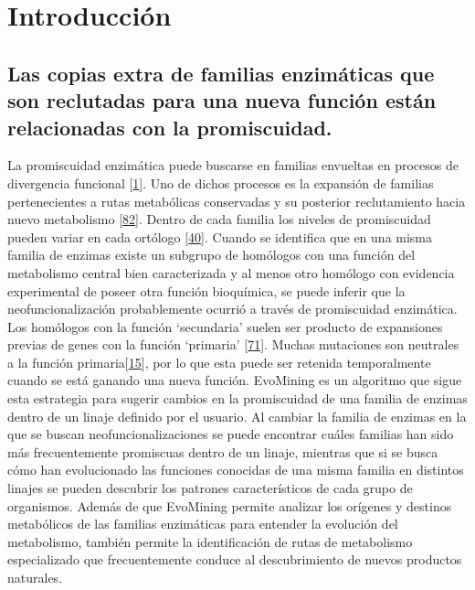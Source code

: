 \documentclass[12pt,twoside]{reedthesis}
\begin{document}
  \section{Introducción}\label{introduccion-1}
  
  \subsection{Las copias extra de familias enzimáticas que son reclutadas
  para una nueva función están relacionadas con la
  promiscuidad.}\label{las-copias-extra-de-familias-enzimaticas-que-son-reclutadas-para-una-nueva-funcion-estan-relacionadas-con-la-promiscuidad.}
  
  La promiscuidad enzimática puede buscarse en familias envueltas en
  procesos de divergencia funcional
  {[}\protect\hyperlink{ref-jensen_enzyme_1976}{1}{]}. Uno de dichos
  procesos es la expansión de familias pertenecientes a rutas metabólicas
  conservadas y su posterior reclutamiento hacia nuevo metabolismo
  {[}\protect\hyperlink{ref-caetano-anolles_origin_metabolism_2009}{82}{]}.
  Dentro de cada familia los niveles de promiscuidad pueden variar en cada
  ortólogo {[}\protect\hyperlink{ref-khanal_differential_2015}{40}{]}.
  Cuando se identifica que en una misma familia de enzimas existe un
  subgrupo de homólogos con una función del metabolismo central bien
  caracterizada y al menos otro homólogo con evidencia experimental de
  poseer otra función bioquímica, se puede inferir que la
  neofuncionalización probablemente ocurrió a través de promiscuidad
  enzimática. Los homólogos con la función `secundaria' suelen ser
  producto de expansiones previas de genes con la función `primaria'
  {[}\protect\hyperlink{ref-huang_enzyme_2012}{71}{]}. Muchas mutaciones
  son neutrales a la función
  primaria{[}\protect\hyperlink{ref-bloom_neutral_2007}{15}{]}, por lo que
  esta puede ser retenida temporalmente cuando se está ganando una nueva
  función. EvoMining es un algoritmo que sigue esta estrategia para
  sugerir cambios en la promiscuidad de una familia de enzimas dentro de
  un linaje definido por el usuario. Al cambiar la familia de enzimas en
  la que se buscan neofuncionalizaciones se puede encontrar cuáles
  familias han sido más frecuentemente promiscuas dentro de un linaje,
  mientras que si se busca cómo han evolucionado las funciones conocidas
  de una misma familia en distintos linajes se pueden descubrir los
  patrones característicos de cada grupo de organismos. Además de que
  EvoMining permite analizar los orígenes y destinos metabólicos de las
  familias enzimáticas para entender la evolución del metabolismo, también
  permite la identificación de rutas de metabolismo especializado que
  frecuentemente conduce al descubrimiento de nuevos productos naturales.
  
\end{document}
